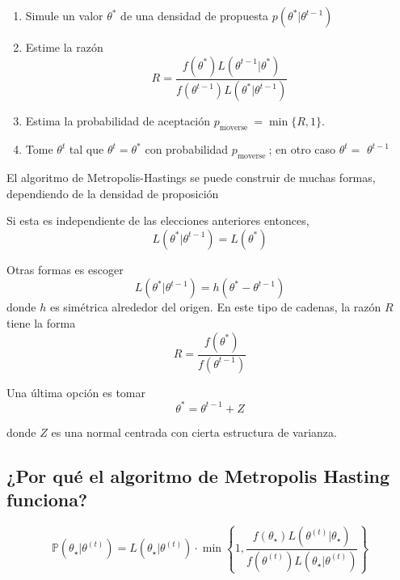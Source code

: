 \documentclass[
  12pt,
]{book}
\providecommand{\tightlist}{%
  \setlength{\itemsep}{0pt}\setlength{\parskip}{0pt}}
\theoremstyle{definition}
\theoremstyle{definition}
\theoremstyle{definition}
\theoremstyle{remark}
\begin{document}
\begin{enumerate}
\def\labelenumi{\arabic{enumi}.}
\tightlist
\item
  Simule un valor \(\theta^{*}\) de una densidad de propuesta
  \(p\left(\theta^{*} | \theta^{t-1}\right)\)
\item
  Estime la razón
  \[
   R=\frac{f\left(\theta^{*}\right) L\left(\theta^{t-1} |
       \theta^{*}\right)}{f\left(\theta^{t-1}\right) L\left(\theta^{*} |
       \theta^{t-1}\right)}
  \]
\item
  Estima la probabilidad de aceptación \(p_{\text {moverse }}=\min \{R, 1\}\).
\item
  Tome \(\theta^{t}\) tal que \(\theta^{t}=\theta^{*}\)
  con probabilidad \(p_{\text {moverse }}\); en otro caso \(\theta^{t}=\) \(\theta^{t-1}\)
\end{enumerate}

El algoritmo de Metropolis-Hastings se puede construir de muchas
formas, dependiendo de la densidad de proposición

Si esta es independiente de las elecciones anteriores entonces,
\[
    L\left(\theta^{*} | \theta^{t-1}\right)=L\left(\theta^{*}\right)
\]

Otras formas es escoger
\[
    L\left(\theta^{*} |
    \theta^{t-1}\right)=h\left(\theta^{*}-\theta^{t-1}\right)
\]
donde \(h\) es simétrica alrededor del origen. En este tipo de
cadenas, la razón \(R\) tiene la forma
\[
    R=\frac{f\left(\theta^{*}\right)}{f\left(\theta^{t-1}\right)}
\]

Una última opción es tomar
\[
    \theta^{*}=\theta^{t-1}+ Z
\]

donde \(Z\) es una normal centrada con cierta estructura de varianza.

\hypertarget{por-quuxe9-el-algoritmo-de-metropolis-hasting-funciona}{%
\subsection{¿Por qué el algoritmo de Metropolis Hasting funciona?}\label{por-quuxe9-el-algoritmo-de-metropolis-hasting-funciona}}

\begin{equation}
\mathbb{P}\left(\theta_{\star} | \theta^{(t)}\right)=L\left(\theta_{\star} | \theta^{(t)}\right) \cdot \min \left\{1, \frac{f\left(\theta_{\star}\right) L\left(\theta^{(t)} | \theta_{\star}\right)}{f\left(\theta^{(t)}\right) L\left(\theta_{\star} | \theta^{(t)}\right)}\right\}
\end{equation}
\end{document}
